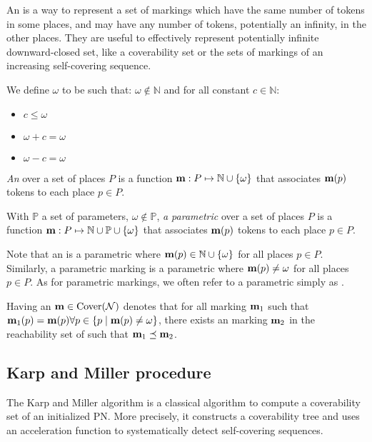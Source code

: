 An \omark is a way to represent a set of markings which have the same number of tokens in some places, and may have any number of tokens, potentially an infinity, in the other places.
They are useful to effectively represent potentially infinite downward-closed set, like a coverability set or the sets of markings of an increasing self-covering sequence.

\begin{defi}[\omark]
  We define $\omega$ to be such that:
  $\omega \notin \mathbb{N}$
  and for all constant $c \in \mathbb{N}$:
  \begin{itemize}
    \item $c \leq \omega$
    \item $\omega + c = \omega$
    \item $\omega - c = \omega$
  \end{itemize}

  \emph{An \omark} \marq over a set of places $P$ is a function $\mathbf{m} : P \mapsto \mathbb{N} \cup \{\omega\}$ that associates $\mathbf{m}(p)$ tokens to each place $p \in P$.

  With $\mathbb{P}$ a set of parameters, $\omega \notin \mathbb{P}$,
  \emph{a parametric \omark} \marq over a set of places $P$ is a function $\mathbf{m} : P \mapsto \mathbb{N} \cup \mathbb{P} \cup \{\omega\}$ that associates $\mathbf{m}(p)$ tokens to each place $p \in P$.
\end{defi}

Note that an \omark \marq is a parametric \omark where $\mathbf{m}(p) \in \mathbb{N} \cup \{\omega\}$ for all places $p \in P$.
Similarly, a parametric marking \marq is a parametric \omark where $\mathbf{m}(p) \neq \omega$ for all places $p \in P$.
As for parametric markings, we often refer to a parametric \omark simply as \omark.

Having an \omark $\mathbf{m} \in \operatorname{Cover}(\mathcal{N})$ denotes that for all marking $\mathbf{m}_1$ such that $\mathbf{m}_1(p) = \mathbf{m}(p) \forall p \in \{p \mid \mathbf{m}(p) \neq \omega\}$, there exists an marking $\mathbf{m}_2$ in the reachability set of \tupleN such that $\mathbf{m}_1 \preceq \mathbf{m}_2$.

\subsection{Karp and Miller procedure}

The Karp and Miller algorithm\cite{Karp69} is a classical algorithm to compute a coverability set of an initialized \ac{PN}.
More precisely, it constructs a coverability tree and uses an acceleration function to systematically detect self-covering sequences.


